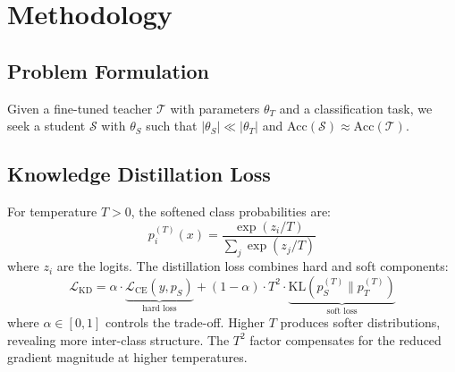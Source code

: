 \documentclass{article}
\begin{document}
\section{Methodology}
\label{sec:method}

\subsection{Problem Formulation}

Given a fine-tuned teacher $\mathcal{T}$ with parameters $\theta_T$ and a classification task, we seek a student $\mathcal{S}$ with $\theta_S$ such that $|\theta_S| \ll |\theta_T|$ and $\text{Acc}(\mathcal{S}) \approx \text{Acc}(\mathcal{T})$.

\subsection{Knowledge Distillation Loss}

For temperature $T > 0$, the softened class probabilities are:
\begin{equation}
    p_i^{(T)}(x) = \frac{\exp(z_i / T)}{\sum_j \exp(z_j / T)}
    \label{eq:softmax}
\end{equation}
where $z_i$ are the logits. The distillation loss combines hard and soft components:
\begin{equation}
    \mathcal{L}_{\text{KD}} = \alpha \cdot \underbrace{\mathcal{L}_{\text{CE}}(y, p_S)}_{\text{hard loss}} + (1 - \alpha) \cdot T^2 \cdot \underbrace{\text{KL}(p_S^{(T)} \| p_T^{(T)})}_{\text{soft loss}}
    \label{eq:kd}
\end{equation}
where $\alpha \in [0,1]$ controls the trade-off. Higher $T$ produces softer distributions, revealing more inter-class structure. The $T^2$ factor compensates for the reduced gradient magnitude at higher temperatures.
\end{document}
